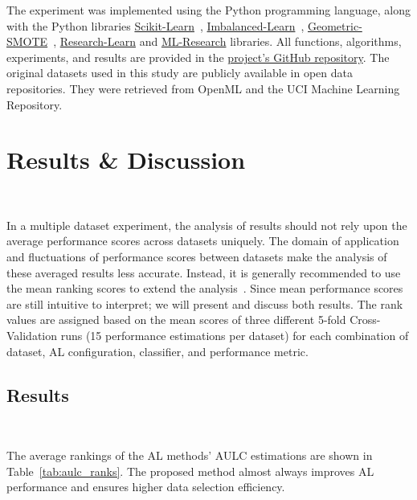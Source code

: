 The experiment was implemented using the Python programming language, along
with the Python libraries
\href{https://scikit-learn.org/stable/}{Scikit-Learn}~\cite{Pedregosa2011},
\href{https://imbalanced-learn.org/en/stable/}{Imbalanced-Learn}~\cite{JMLR:v18:16-365},
\href{https://geometric-smote.readthedocs.io/en/latest/?badge=latest}{Geometric-SMOTE}~\cite{Douzas2019},
\href{https://research-learn.readthedocs.io/en/latest/?badge=latest}{Research-Learn}
and
\href{https://mlresearch.readthedocs.io/en/latest/?badge=latest}{ML-Research}
libraries. All functions, algorithms, experiments, and results are provided in
the \href{https://github.com/joaopfonseca/publications/}{project's GitHub
repository}. The original datasets used in this study are publicly available
in open data repositories. They were retrieved from OpenML and the UCI Machine
Learning Repository. 

\section{Results \& Discussion}~\label{sec:results_discussion-al-aug}

In a multiple dataset experiment, the analysis of results should not rely upon
the average performance scores across datasets uniquely. The domain of
application and fluctuations of performance scores between datasets make the
analysis of these averaged results less accurate. Instead, it is generally
recommended to use the mean ranking scores to extend the
analysis~\cite{Demsar2006}. Since mean performance scores are still intuitive
to interpret; we will present and discuss both results. The rank values are
assigned based on the mean scores of three different 5-fold Cross-Validation
runs (15 performance estimations per dataset) for each combination of dataset,
AL configuration, classifier, and performance metric.
 
\subsection{Results}~\label{sec:results-al-aug}

The average rankings of the AL methods' AULC estimations are shown in
Table~\ref{tab:aulc_ranks}. The proposed method almost always improves AL
performance and ensures higher data selection efficiency.
 
\begin{table}[ht]
	\centering
    \caption[Mean rankings of the AULC metric over the different datasets (15),
        folds (5), and runs (3) used in the experiment.]{%
        Mean rankings of the AULC metric over the different datasets (15),
        folds (5), and runs (3) used in the experiment. The proposed method
        constantly improves the results of the original framework and, on
        average, almost always improves the results of the oversampling
        framework.
    }\label{tab:aulc_ranks}
\end{table}
 
